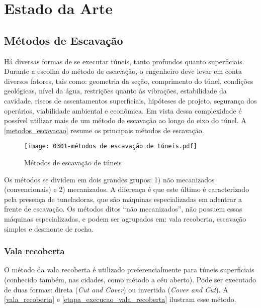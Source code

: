 \chapter{Estado da Arte}

\section{Métodos de Escavação}

Há diversas formas de se executar túneis, tanto profundos quanto superficiais. Durante a escolha do método de escavação, o engenheiro deve levar em conta diversos fatores, tais como: geometria da seção, comprimento do túnel, condições geológicas, nível da água, restrições quanto às vibrações, estabilidade da cavidade, riscos de assentamentos superficiais, hipóteses de projeto, segurança dos operários, viabilidade ambiental e econômica. Em vista dessa complexidade é possível utilizar mais de um método de escavação ao longo do eixo do túnel. A \autoref{metodos_escavacao} resume os principais métodos de escavação.

\begin{figure}[H]
	\begin{center}
		\texttt{[image: 0301-métodos de escavação de túneis.pdf]}
	\end{center}
	\caption{\label{metodos_escavacao}Métodos de escavação de túneis}
\end{figure}

Os métodos se dividem em dois grandes grupos: 1) não mecanizados (convencionais) e 2) mecanizados. A diferença é que este último é caracterizado pela presença de tuneladoras, que são máquinas especializadas em adentrar a frente de escavação. Os métodos ditos “não mecanizados”, não possuem essas máquinas especializadas, e podem ser agrupados em: vala recoberta, escavação simples e desmonte de rocha.

\subsection{Vala recoberta}

O método da vala recoberta é utilizado preferencialmente para túneis superficiais (conhecido também, nas cidades, como método a céu aberto). Pode ser executado de duas formas: direta (\textit{Cut and Cover}) ou invertida (\textit{Cover and Cut}). A \autoref{vala_recoberta} e \autoref{etapa_execucao_vala_recoberta} ilustram esse método.

